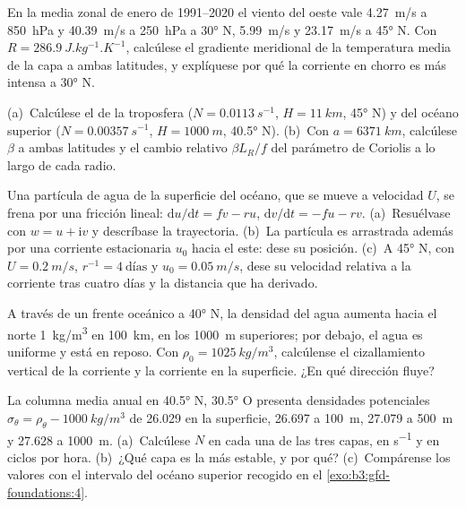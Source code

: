 \begin{exercise}[$\star\star$]\label{exo:b3:gfd-foundations:8}
En la media zonal de enero de 1991--2020 el viento del oeste vale \qty{4.27}{m/s}
a \qty{850}{hPa} y \qty{40.39}{m/s} a \qty{250}{hPa} a \ang{30} N,
\qty{5.99}{m/s} y \qty{23.17}{m/s} a \ang{45} N. Con $R =
\qty{286.9}{J.kg^{-1}.K^{-1}}$, calcúlese el gradiente meridional de la temperatura
media de la capa a ambas latitudes, y explíquese por qué la corriente en chorro es
más intensa a \ang{30} N.
\end{exercise}

\begin{exercise}[$\star\star$]\label{exo:b3:gfd-foundations:9}
(a)~Calcúlese el  de la troposfera ($N =
\qty{0.0113}{s^{-1}}$, $H = \qty{11}{km}$, \ang{45} N) y del océano superior
($N = \qty{0.00357}{s^{-1}}$, $H = \qty{1000}{m}$, \ang{40.5} N).
(b)~Con $a = \qty{6371}{km}$, calcúlese $\beta$ a ambas latitudes y el cambio relativo
$\beta L_R/f$ del parámetro de Coriolis a lo largo de cada radio.
\end{exercise}

\begin{exercise}[$\star\star\star$]\label{exo:b3:gfd-foundations:10}
Una partícula de agua de la superficie del océano, que se mueve a velocidad $U$, se frena por
una fricción lineal: $\mathrm du/\mathrm dt = fv - ru$, $\mathrm dv/\mathrm dt = -fu -
rv$. (a)~Resuélvase con $w = u + \mathrm iv$ y descríbase la trayectoria. (b)~La
partícula es arrastrada además por una corriente estacionaria $u_0$ hacia el este: dese su
posición. (c)~A \ang{45} N, con $U = \qty{0.2}{m/s}$, $r^{-1} =
\num{4}~\text{días}$ y $u_0 = \qty{0.05}{m/s}$, dese su velocidad relativa a la corriente
tras cuatro días y la distancia que ha derivado.
\end{exercise}

\begin{exercise}[$\star\star\star$]\label{exo:b3:gfd-foundations:11}
A través de un frente oceánico a \ang{40} N, la densidad del agua aumenta hacia el norte
\qty{1}{kg/m^3} en \qty{100}{km}, en los
\qty{1000}{m} superiores; por debajo, el agua es uniforme y está en reposo. Con $\rho_0 =
\qty{1025}{kg/m^3}$, calcúlense el cizallamiento vertical de la corriente y la
corriente en la superficie. ¿En qué dirección fluye?
\end{exercise}

\begin{exercise}[$\star\star\star$]\label{exo:b3:gfd-foundations:12}
La columna media anual en \ang{40.5} N, \ang{30.5} O presenta
densidades potenciales $\sigma_\theta = \rho_\theta - \qty{1000}{kg/m^3}$ de 26.029 en
la superficie, 26.697 a \qty{100}{m}, 27.079 a \qty{500}{m} y 27.628 a
\qty{1000}{m}. (a)~Calcúlese $N$ en cada una de las tres capas, en
\unit{s^{-1}} y en ciclos por hora. (b)~¿Qué capa es la más estable,
y por qué? (c)~Compárense los valores con el intervalo del océano superior
recogido en el \cref{exo:b3:gfd-foundations:4}.
\end{exercise}

